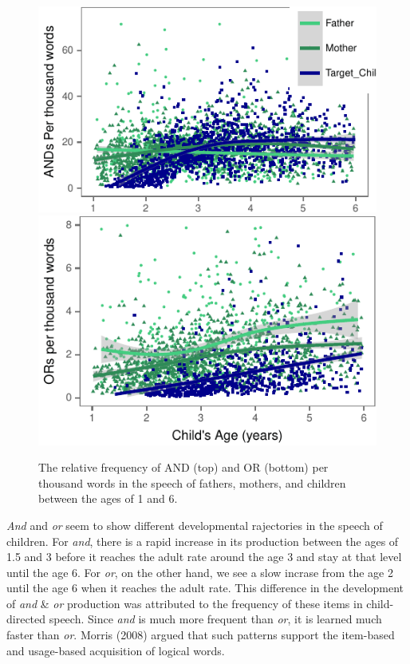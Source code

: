 \documentclass[10pt, letterpaper]{article}
\newenvironment{CodeChunk}{}{}
\begin{document}
\begin{CodeChunk}
\begin{figure}[H]
\includegraphics{figs/OverallConnectivePlots-1} \includegraphics{figs/OverallConnectivePlots-2} \caption[The relative frequency of AND (top) and OR (bottom) per thousand words in the speech of fathers, mothers, and children between the ages of 1 and 6]{The relative frequency of AND (top) and OR (bottom) per thousand words in the speech of fathers, mothers, and children between the ages of 1 and 6.}\label{fig:OverallConnectivePlots}
\end{figure}
\end{CodeChunk}

\emph{And} and \emph{or} seem to show different developmental
rajectories in the speech of children. For \emph{and}, there is a rapid
increase in its production between the ages of 1.5 and 3 before it
reaches the adult rate around the age 3 and stay at that level until the
age 6. For \emph{or}, on the other hand, we see a slow incrase from the
age 2 until the age 6 when it reaches the adult rate. This difference in
the development of \emph{and} \& \emph{or} production was attributed to
the frequency of these items in child-directed speech. Since \emph{and}
is much more frequent than \emph{or}, it is learned much faster than
\emph{or}. Morris (2008) argued that such patterns support the
item-based and usage-based acquisition of logical words.
\end{document}
